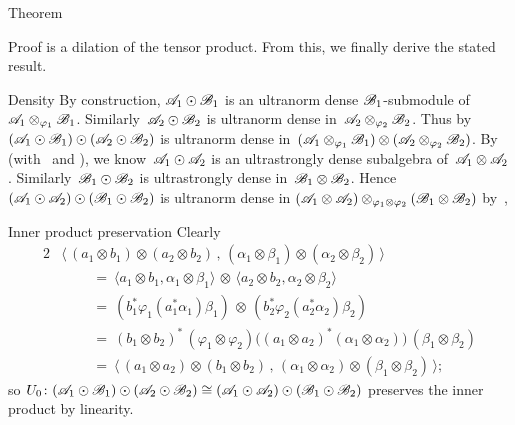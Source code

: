 \documentclass[b]{subfiles}
\begin{document}
\begin{parsec}
\begin{point}{Theorem}
\begin{point}{Proof}
    is a dilation of the tensor product.
    From this, we finally derive the stated result.
\begin{point}{Density}%
By construction, $\mathscr{A}_1 \odot \mathscr{B}_1$ is an ultranorm dense
        $\mathscr{B}_1$-submodule
    of~$\mathscr{A}_1 \otimes_{\varphi_1} \mathscr{B}_1$.
Similarly~$\mathscr{A}_2 \odot \mathscr{B}_2 $ is ultranorm dense
    in~$\mathscr{A}_2 \otimes_{\varphi_2} \mathscr{B}_2$.
Thus by 
    $(\mathscr{A}_1 \odot \mathscr{B}_1) \odot(
    \mathscr{A}_2 \odot \mathscr{B}_2) $ is ultranorm dense in~$(\mathscr{A}_1 \otimes_{\varphi_1} \mathscr{B}_1)
\otimes (\mathscr{A}_2 \otimes_{\varphi_2} \mathscr{B}_2)$.
By 
        (with~ and ),
    we know~$\mathscr{A}_1 \odot \mathscr{A}_2$
    is an ultrastrongly dense subalgebra
    of~$\mathscr{A}_1 \otimes \mathscr{A}_2$.
Similarly~$\mathscr{B}_1 \odot \mathscr{B}_2$
    is ultrastrongly dense in~$\mathscr{B}_1 \otimes \mathscr{B}_2$.
Hence~$(\mathscr{A}_1 \odot \mathscr{A}_2) \odot 
    (\mathscr{B}_1 \odot \mathscr{B}_2)$ is ultranorm dense
    in
    $(\mathscr{A}_1 \otimes \mathscr{A}_2) \otimes_{\varphi_1 \otimes \varphi_2}
    (\mathscr{B}_1 \otimes \mathscr{B}_2)$
        by~,
\end{point}
\begin{point}{Inner product preservation}%
Clearly
\begin{alignat*}{2}
    &
    \bigl\langle\,
    (a_1 \otimes b_1)\otimes (a_2 \otimes b_2)\,,\,
    (\alpha_1 \otimes \beta_1 )\otimes( \alpha_2 \otimes \beta_2)
    \,\bigr\rangle \\
    & \qquad\ = \ 
    \langle a_1 \otimes b_1 , \alpha_1 \otimes \beta_1 \rangle \,\otimes\,
    \langle a_2 \otimes b_2 , \alpha_2 \otimes \beta_2 \rangle \\
    & \qquad\ = \ 
    (b_1^* \varphi_1( a_1^* \alpha_1) \beta_1)
    \,\otimes \,
    (b_2^* \varphi_2( a_2^* \alpha_2) \beta_2) \\
    & \qquad \ = \ 
    (b_1 \otimes b_2)^* \,(\varphi_1 \otimes \varphi_2)
    \bigl((a_1 \otimes a_2)^* (\alpha_1 \otimes \alpha_2)\bigr)
    \,(\beta_1 \otimes \beta_2) \\
    & \qquad \ = \ 
    \bigl\langle\,
    (a_1\otimes a_2)\otimes (b_1 \otimes b_2) \,,\,
    (\alpha_1\otimes \alpha_2)\otimes (\beta_1 \otimes \beta_2)
    \,\bigr\rangle;
\end{alignat*}
so $U_0 \colon (\mathscr{A}_1 \odot \mathscr{B}_1) \odot (\mathscr{A}_2 \odot \mathscr{B}_2) \cong
(\mathscr{A}_1 \odot \mathscr{A}_2) \odot (\mathscr{B}_1 \odot \mathscr{B}_2) $
preserves the inner product by linearity.
\end{point}

\end{point}
\end{point}
\end{parsec}
\end{document}
